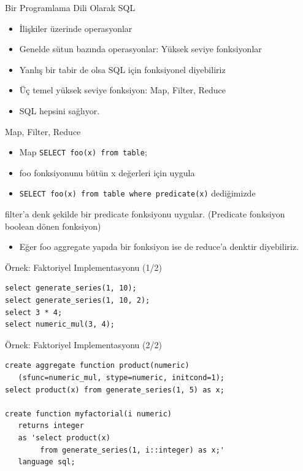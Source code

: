 \documentclass[presentation]{beamer}
\begin{document}
\begin{frame}[label=sec-3]{Bir Programlama Dili Olarak SQL}
\begin{itemize}
\item İlişkiler üzerinde operasyonlar
\item Genelde sütun bazında operasyonlar: Yüksek seviye fonksiyonlar
\item Yanlış bir tabir de olsa SQL için fonksiyonel diyebiliriz
\item Üç temel yüksek seviye fonksiyon: Map, Filter, Reduce
\item SQL hepsini sağlıyor.
\end{itemize}
\end{frame}

\begin{frame}[fragile,label=sec-4]{Map, Filter, Reduce}
 \begin{itemize}
\item Map \texttt{SELECT foo(x) from table};
\item foo fonksiyonunu bütün x değerleri için uygula
\item \texttt{SELECT foo(x) from table where predicate(x)} dediğimizde
\end{itemize}
filter'a denk şekilde bir predicate fonksiyonu uygular. (Predicate fonksiyon
boolean dönen fonksiyon)
\begin{itemize}
\item Eğer foo aggregate yapıda bir fonksiyon ise de reduce'a denktir diyebiliriz.
\end{itemize}
\end{frame}

\begin{frame}[fragile,label=sec-5]{Örnek: Faktoriyel Implementasyonu (1/2)}
 \begin{verbatim}
select generate_series(1, 10);
select generate_series(1, 10, 2);
select 3 * 4;
select numeric_mul(3, 4);
\end{verbatim}
\end{frame}

\begin{frame}[fragile,label=sec-6]{Örnek: Faktoriyel Implementasyonu (2/2)}
 \begin{verbatim}
create aggregate function product(numeric)
   (sfunc=numeric_mul, stype=numeric, initcond=1);
select product(x) from generate_series(1, 5) as x;

create function myfactorial(i numeric)
   returns integer
   as 'select product(x)
        from generate_series(1, i::integer) as x;'
   language sql;
\end{verbatim}
\end{frame}
\end{document}
